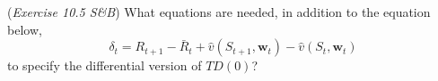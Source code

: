 (\textit{Exercise 10.5 S\&B})
What equations are needed, in addition to the equation below,
$$\delta_{t} = R_{t+1} - \bar R_{t} + \hat v (S_{t+1}, \mathbf{w}_{t}) - \hat v (S_{t}, \mathbf{w}_{t})$$
to specify the differential version of $TD(0)$?